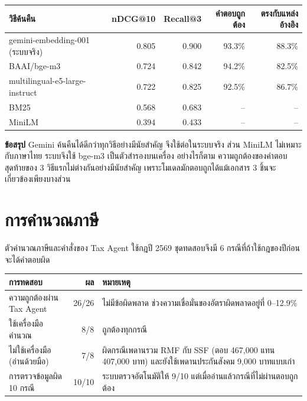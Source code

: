 \documentclass[12pt,a4paper]{article}
\begin{document}
\begin{table}[H]
\centering
\small
\begin{tabular}{lrrrr}
\toprule
\textbf{วิธีค้นคืน} & \textbf{nDCG@10} & \textbf{Recall@3} & \textbf{คำตอบถูกต้อง} & \textbf{ตรงกับแหล่งอ้างอิง} \\
\midrule
gemini-embedding-001 (ระบบจริง) & 0.805 & 0.900 & 93.3\% & 88.3\% \\
BAAI/bge-m3 & 0.724 & 0.842 & 94.2\% & 82.5\% \\
multilingual-e5-large-instruct & 0.722 & 0.825 & 92.5\% & 86.7\% \\
BM25 & 0.568 & 0.683 & -- & -- \\
MiniLM & 0.394 & 0.433 & -- & -- \\
\bottomrule
\end{tabular}
\end{table}

\begin{takeaway}
\textbf{ข้อสรุป} \quad Gemini ค้นคืนได้ดีกว่าทุกวิธีอย่างมีนัยสำคัญ จึงใช้ต่อในระบบจริง ส่วน MiniLM ไม่เหมาะกับภาษาไทย ระบบจึงใช้ bge-m3 เป็นตัวสำรองบนเครื่อง อย่างไรก็ตาม ความถูกต้องของคำตอบสุดท้ายของ 3 วิธีแรกไม่ต่างกันอย่างมีนัยสำคัญ เพราะโมเดลมักตอบถูกได้แม้เอกสาร 3 ชิ้นจะเกี่ยวข้องเพียงบางส่วน
\end{takeaway}

\section{การคำนวณภาษี}

ตัวคำนวณภาษีและคำสั่งของ Tax Agent ใช้กฎปี 2569 ชุดทดสอบจึงมี 6 กรณีที่ถ้าใช้กฎของปีก่อนจะได้คำตอบผิด

\begin{table}[H]
\centering
\small
\begin{tabular}{L{4cm}rL{8.6cm}}
\toprule
\textbf{การทดสอบ} & \textbf{ผล} & \textbf{หมายเหตุ} \\
\midrule
ความถูกต้องผ่าน Tax Agent & 26/26 & ไม่มีข้อผิดพลาด ช่วงความเชื่อมั่นของอัตราผิดพลาดอยู่ที่ 0--12.9\% \\
ใช้เครื่องมือคำนวณ & 8/8 & ถูกต้องทุกกรณี \\
ไม่ใช้เครื่องมือ (อ่านด้วยมือ) & 7/8 & ผิดกรณีเพดานรวม RMF กับ SSF (ตอบ 467,000 แทน 407,000 บาท) และยังใช้เพดานประกันสังคม 9,000 บาทแบบเก่า \\
การตรวจข้อมูลผิด 10 กรณี & 10/10 & ระบบตรวจอัตโนมัติให้ 9/10 แต่เมื่ออ่านแล้วกรณีที่ไม่ผ่านตอบถูกต้อง \\
\bottomrule
\end{tabular}
\end{table}
\end{document}
